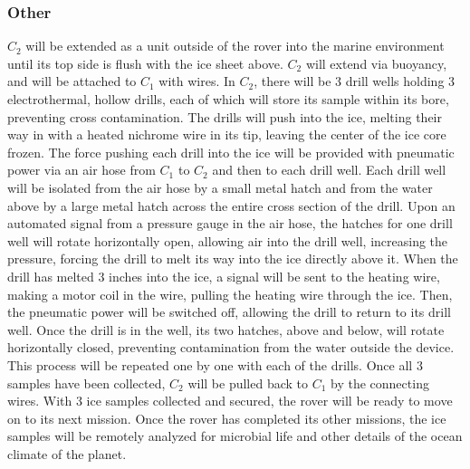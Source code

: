 \documentclass{article}
\begin{document}
\subsubsection{Other}

$C_2$ will be extended as a unit outside of the rover into the marine environment until its top side is flush with the ice sheet above. $C_2$ will extend via buoyancy, and will be attached to $C_1$ with wires. In $C_2$, there will be 3 drill wells holding 3 electrothermal, hollow drills, each of which will store its sample within its bore, preventing cross contamination. The drills will push into the ice, melting their way in with a heated nichrome wire in its tip, leaving the center of the ice core frozen. The force pushing each drill into the ice will be provided with pneumatic power via an air hose from $C_1$ to $C_2$ and then to each drill well. Each drill well will be isolated from the air hose by a small metal hatch and from the water above by a large metal hatch across the entire cross section of the drill. Upon an automated signal from a pressure gauge in the air hose, the hatches for one drill well will rotate horizontally open, allowing air into the drill well, increasing the pressure, forcing the drill to melt its way into the ice directly above it. When the drill has melted 3 inches into the ice, a signal will be sent to the heating wire, making a motor coil in the wire, pulling the heating wire through the ice. Then, the pneumatic power will be switched off, allowing the drill to return to its drill well. Once the drill is in the well, its two hatches, above and below, will rotate horizontally closed, preventing contamination from the water outside the device. This process will be repeated one by one with each of the drills. Once all 3 samples have been collected, $C_2$ will be pulled back to $C_1$ by the connecting wires. With 3 ice samples collected and secured, the rover will be ready to move on to its next mission. Once the rover has completed its other missions, the ice samples will be remotely analyzed for microbial life and other details of the ocean climate of the planet.
\end{document}
